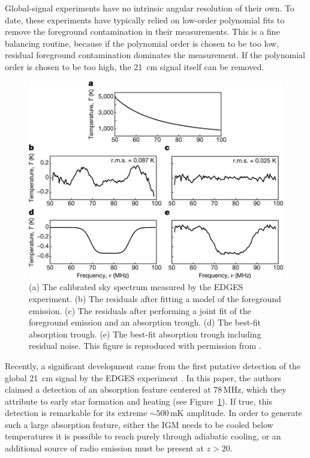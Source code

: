 \begin{bibunit}
Global-signal experiments have no intrinsic angular resolution of their own. To date, these
experiments have typically relied on low-order polynomial fits to remove the foreground
contamination in their measurements. This is a fine balancing routine, because if the polynomial
order is chosen to be too low, residual foreground contamination dominates the measurement. If the
polynomial order is chosen to be too high, the 21~cm signal itself can be removed.

\begin{figure}[t]
    \centering
    \includegraphics[width=\textwidth]{figures/chapter1/bowman-2018-absorption-trough}
    \caption{
        (a) The calibrated sky spectrum measured by the EDGES experiment.
        (b) The residuals after fitting a model of the foreground emission.
        (c) The residuals after performing a joint fit of the foreground emission and an absorption
        trough.
        (d) The best-fit absorption trough.
        (e) The best-fit absorption trough including residual noise.
        This figure is reproduced with permission from \citet{2018Natur.555...67B}.
    }
    \label{fig:bowman-absorption-trough}
\end{figure}

Recently, a significant development came from the first putative detection of the global 21~cm
signal by the EDGES experiment \citep{2018Natur.555...67B}. In this paper, the authors claimed a
detection of an absorption feature centered at $78\,\text{MHz}$, which they attribute to early star
formation and heating (see Figure~\ref{fig:bowman-absorption-trough}). If true, this detection is
remarkable for its extreme $\sim500\,\text{mK}$ amplitude. In order to generate such a large
absorption feature, either the IGM needs to be cooled below temperatures it is possible to reach
purely through adiabatic cooling, or an additional source of radio emission must be present at $z >
20$.


\end{bibunit}

